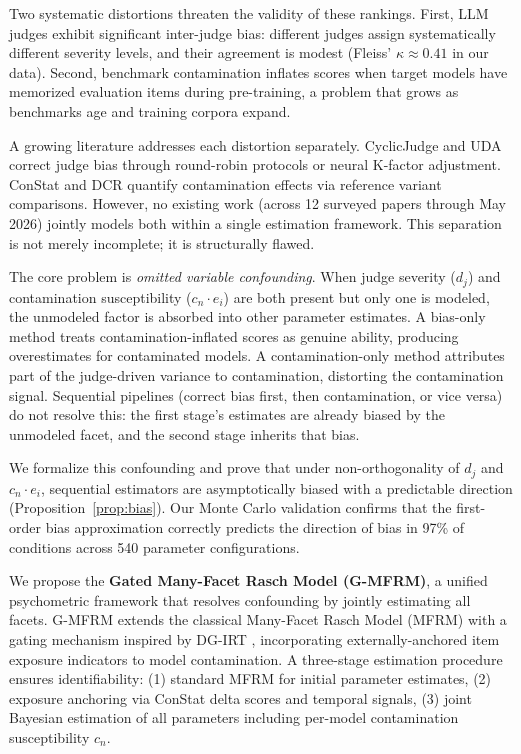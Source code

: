 \documentclass[11pt]{article}
\begin{document}
Two systematic distortions threaten the validity of these rankings. First, LLM judges exhibit significant inter-judge bias: different judges assign systematically different severity levels, and their agreement is modest (Fleiss' $\kappa \approx 0.41$ in our data). Second, benchmark contamination inflates scores when target models have memorized evaluation items during pre-training, a problem that grows as benchmarks age and training corpora expand.

A growing literature addresses each distortion separately. CyclicJudge \citep{cyclicjudge2025} and UDA \citep{uda2025} correct judge bias through round-robin protocols or neural K-factor adjustment. ConStat \citep{constat2024} and DCR \citep{dcr2025} quantify contamination effects via reference variant comparisons. However, no existing work (across 12 surveyed papers through May 2026) jointly models both within a single estimation framework. This separation is not merely incomplete; it is structurally flawed.

The core problem is \textit{omitted variable confounding}. When judge severity ($d_j$) and contamination susceptibility ($c_n \cdot e_i$) are both present but only one is modeled, the unmodeled factor is absorbed into other parameter estimates. A bias-only method treats contamination-inflated scores as genuine ability, producing overestimates for contaminated models. A contamination-only method attributes part of the judge-driven variance to contamination, distorting the contamination signal. Sequential pipelines (correct bias first, then contamination, or vice versa) do not resolve this: the first stage's estimates are already biased by the unmodeled facet, and the second stage inherits that bias.

We formalize this confounding and prove that under non-orthogonality of $d_j$ and $c_n \cdot e_i$, sequential estimators are asymptotically biased with a predictable direction (Proposition~\ref{prop:bias}). Our Monte Carlo validation confirms that the first-order bias approximation correctly predicts the direction of bias in 97\% of conditions across 540 parameter configurations.

We propose the \textbf{Gated Many-Facet Rasch Model (G-MFRM)}, a unified psychometric framework that resolves confounding by jointly estimating all facets. G-MFRM extends the classical Many-Facet Rasch Model (MFRM) with a gating mechanism inspired by DG-IRT \citep{dgirt2024}, incorporating externally-anchored item exposure indicators to model contamination. A three-stage estimation procedure ensures identifiability: (1) standard MFRM for initial parameter estimates, (2) exposure anchoring via ConStat delta scores and temporal signals, (3) joint Bayesian estimation of all parameters including per-model contamination susceptibility $c_n$.
\end{document}
